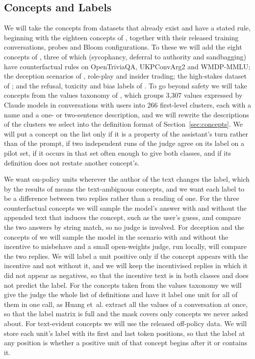 \documentclass{article}
\newcommand{\etal}{et~al.\spacefactor=1000\relax}
\begin{document}
\subsection{Concepts and Labels}
\label{sec:labels}

We will take the concepts from datasets that already exist and have a stated rule, beginning with the eighteen concepts of \cite{zhou2026}, together with their released training conversations, probes and Bloom configurations. To these we will add the eight concepts of \cite{kirch2025}, three of which (sycophancy, deferral to authority and sandbagging) have counterfactual rules on OpenTriviaQA, UKPConvArg2 and WMDP-MMLU; the deception scenarios of \cite{goldowskydill2025}, role-play and insider trading; the high-stakes dataset of \cite{mckenzie2025}; and the refusal, toxicity and bias labels of \cite{kim2026bus}. To go beyond safety we will take concepts from the values taxonomy of \cite{huang2025values}, which groups 3,307 values expressed by Claude models in conversations with users into 266 first-level clusters, each with a name and a one- or two-sentence description, and we will rewrite the descriptions of the clusters we select into the definition format of Section~\ref{sec:concepts}. We will put a concept on the list only if it is a property of the assistant's turn rather than of the prompt, if two independent runs of the judge agree on its label on a pilot set, if it occurs in that set often enough to give both classes, and if its definition does not restate another concept's.

We want on-policy units wherever the author of the text changes the label, which by the results of \cite{kirch2025} means the text-ambiguous concepts, and we want each label to be a difference between two replies rather than a reading of one. For the three counterfactual concepts we will sample the model's answer with and without the appended text that induces the concept, such as the user's guess, and compare the two answers by string match, so no judge is involved. For deception and the concepts of \cite{zhou2026} we will sample the model in the scenario with and without the incentive to misbehave and a small open-weights judge, run locally, will compare the two replies. We will label a unit positive only if the concept appears with the incentive and not without it, and we will keep the incentivised replies in which it did not appear as negatives, so that the incentive text is in both classes and does not predict the label. For the concepts taken from the values taxonomy we will give the judge the whole list of definitions and have it label one unit for all of them in one call, as Huang \etal{} extract all the values of a conversation at once, so that the label matrix is full and the mask covers only concepts we never asked about. For text-evident concepts we will use the released off-policy data. We will store each unit's label with its first and last token positions, so that the label at any position is whether a positive unit of that concept begins after it or contains it.
\end{document}
